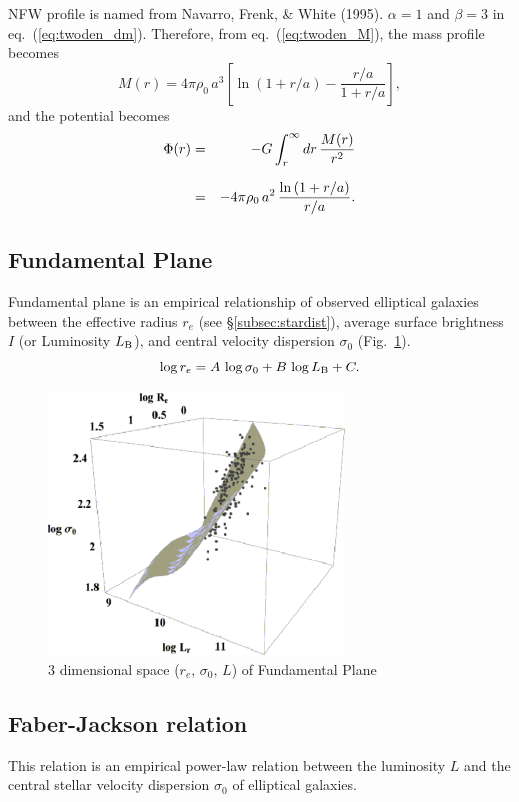 
NFW profile is named from Navarro, Frenk, \& White (1995).
$\alpha=1$ and $\beta=3$ in eq.~(\ref{eq:twoden_dm}).
Therefore, from eq.~(\ref{eq:twoden_M}), the mass profile becomes
\begin{equation}
    M(r) = 4\pi\rho_{0}\,a^{3} \left[ \ln{(1+r/a)} - \frac{r/a}{1+r/a} \right],
\end{equation}
and the potential becomes
\begin{eqnarray}
    \Phi(r) &=& -G\int^{\infty}_{r} dr\,\frac{M(r)}{r^{2}} \nonumnext
            &=& -4\pi\rho_{0}\,a^{2}\, \frac{\ln{(1+r/a)}}{r/a}.
\end{eqnarray}


\bigskip
\subsection{Fundamental Plane}
Fundamental plane is an empirical relationship of observed elliptical galaxies between the
effective radius $r_{e}$ (see \S\ref{subsec:stardist}), average surface brightness $I$ (or
Luminosity $L_{\rm B}$), and central velocity dispersion $\sigma_{0}$ (Fig.~\ref{fig:fundp}).
\begin{equation}
    \log{r_{e}} = A\,\log{\sigma_{0}} + B\,\log{L_{\rm B}} + C.
\end{equation}

\begin{figure}[!htbp]
    \centering
    \includegraphics[width=0.7\textwidth]{Galactic/fundamentalplane}
    \caption{3 dimensional space ($r_{e},\,\sigma_{0},\,L$) of Fundamental Plane}
    \label{fig:fundp}
\end{figure}

\bigskip
\subsection{Faber-Jackson relation}
This relation is an empirical power-law relation between the luminosity $L$ and the central 
stellar velocity dispersion $\sigma_{0}$ of elliptical galaxies. 

